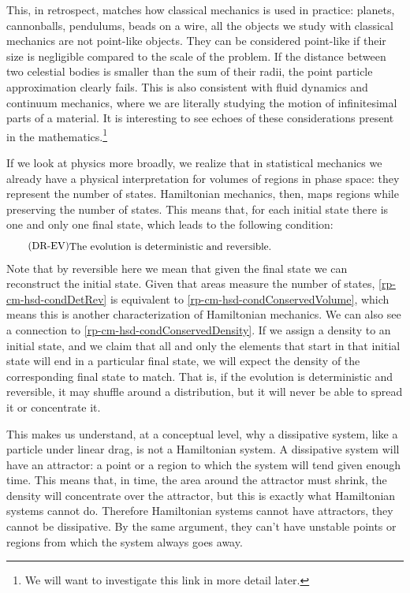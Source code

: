 This, in retrospect, matches how classical mechanics is used in practice: planets, cannonballs, pendulums, beads on a wire, all the objects we study with classical mechanics are not point-like objects. They can be considered point-like if their size is negligible compared to the scale of the problem. If the distance between two celestial bodies is smaller than the sum of their radii, the point particle approximation clearly fails. This is also consistent with fluid dynamics and continuum mechanics, where we are literally studying the motion of infinitesimal parts of a material. It is interesting to see echoes of these considerations present in the mathematics.\footnote{We will want to investigate this link in more detail later.}

If we look at physics more broadly, we realize that in statistical mechanics we already have a physical interpretation for volumes of regions in phase space: they represent the number of states. Hamiltonian mechanics, then, maps regions while preserving the number of states. This means that, for each initial state there is one and only one final state, which leads to the following condition:
\begin{equation}\label{rp-cm-hsd-condDetRev}
	\tag{DR-EV}
	\eqtext{The evolution is deterministic and reversible.}	
\end{equation}
Note that by reversible here we mean that given the final state we can reconstruct the initial state. Given that areas measure the number of states, \ref{rp-cm-hsd-condDetRev} is equivalent to \ref{rp-cm-hsd-condConservedVolume}, which means this is another characterization of Hamiltonian mechanics. We can also see a connection to \ref{rp-cm-hsd-condConservedDensity}. If we assign a density to an initial state, and we claim that all and only the elements that start in that initial state will end in a particular final state, we will expect the density of the corresponding final state to match. That is, if the evolution is deterministic and reversible, it may shuffle around a distribution, but it will never be able to spread it or concentrate it.

This makes us understand, at a conceptual level, why a dissipative system, like a particle under linear drag, is not a Hamiltonian system. A dissipative system will have an attractor: a point or a region to which the system will tend given enough time. This means that, in time, the area around the attractor must shrink, the density will concentrate over the attractor, but this is exactly what Hamiltonian systems cannot do. Therefore Hamiltonian systems cannot have attractors, they cannot be dissipative. By the same argument, they can't have unstable points or regions from which the system always goes away.


